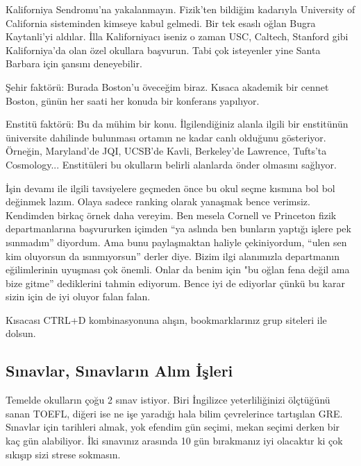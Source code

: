 \documentclass[12pt]{article}
\begin{document}
Kaliforniya Sendromu'na yakalanmayın. Fizik'ten bildiğim kadarıyla University of California sisteminden kimseye kabul gelmedi. Bir tek esaslı oğlan Bugra Kaytanli'yi aldılar. İlla Kaliforniyacı iseniz o zaman USC, Caltech, Stanford gibi Kaliforniya'da olan özel okullara başvurun. Tabi çok isteyenler yine Santa Barbara için şansını deneyebilir. 

Şehir faktörü: Burada Boston'u öveceğim biraz. Kısaca akademik bir cennet Boston, günün her saati her konuda bir konferans yapılıyor. 

Enstitü faktörü: Bu da mühim bir konu. İlgilendiğiniz alanla ilgili bir enstitünün üniversite dahilinde bulunması ortamın ne kadar canlı olduğunu gösteriyor. Örneğin, Maryland'de JQI, UCSB'de Kavli, Berkeley'de Lawrence, Tufts'ta Cosmology... Enstitüleri bu okulların belirli alanlarda önder olmasını sağlıyor. 

İşin devamı ile ilgili tavsiyelere geçmeden önce bu okul seçme kısmına bol bol değinmek lazım. Olaya sadece ranking olarak yanaşmak bence verimsiz. Kendimden birkaç örnek daha vereyim.  
Ben mesela Cornell ve Princeton fizik departmanlarına başvururken içimden ``ya aslında ben bunların yaptığı işlere pek ısınmadım'' diyordum. Ama bunu paylaşmaktan haliyle çekiniyordum, “ulen sen kim oluyorsun da ısınmıyorsun” derler diye. Bizim ilgi alanımızla departmanın eğilimlerinin uyuşması çok önemli. Onlar da benim için "bu oğlan fena değil ama bize gitme'' dediklerini tahmin ediyorum. Bence iyi de ediyorlar çünkü bu karar sizin için de iyi oluyor falan falan. 

Kısacası CTRL+D kombinasyonuna alışın, bookmarklarınız grup siteleri ile dolsun.  

\subsection{Sınavlar, Sınavların Alım İşleri}
Temelde okulların çoğu 2 sınav istiyor. Biri İngilizce yeterliliğinizi ölçtüğünü sanan TOEFL, diğeri ise ne işe yaradığı hala bilim çevrelerince tartışılan GRE. Sınavlar için tarihleri almak, yok efendim gün seçimi, mekan seçimi derken bir kaç gün alabiliyor. İki sınavınız arasında 10 gün bırakmanız iyi olacaktır ki çok sıkışıp sizi strese sokmasın. 
\end{document}
